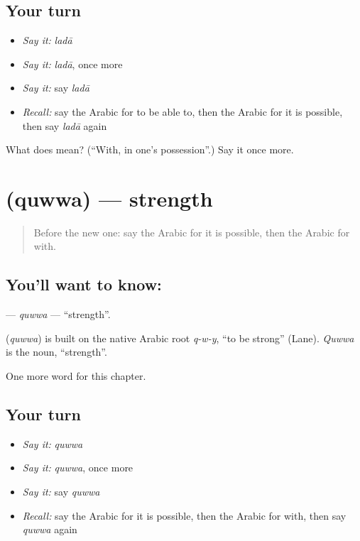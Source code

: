 \subsection*{Your turn}
\begin{itemize}
\raggedright
  \item \emph{Say it:} \emph{ladā}
  \item \emph{Say it:} \emph{ladā}, once more
  \item \emph{Say it:} say \emph{ladā}
  \item \emph{Recall:} say the Arabic for to be able to, then the Arabic for it is possible, then say \emph{ladā} again
\end{itemize}

\begin{tcolorbox}[breakable,colback=teal!4,colframe=teal!35!black,title={Before you move on}]
What does  mean? (\textquotedblleft{}With, in one's possession\textquotedblright{}.) Say it once more.
\end{tcolorbox}
\section[\texorpdfstring{\ar{قوة} (quwwa)}{قوة (quwwa)}]{ (quwwa) — strength}

\label{lesson:AR-C108-quwwa}



\begin{quote}
Before the new one: say the Arabic for it is possible, then the Arabic for with.
\end{quote}

\subsection*{You'll want to know: }
\textbf{} — \emph{quwwa} — \textquotedblleft{}strength\textquotedblright{}.

\begin{cousinweb}
\textbf{} (\emph{quwwa}) is built on the native Arabic root \emph{q-w-y}, \textquotedblleft{}to be strong\textquotedblright{} (Lane). \emph{Quwwa} is the noun, \textquotedblleft{}strength\textquotedblright{}.
\end{cousinweb}

\begin{grammarlens}[title={What you've built}]
One more word for this chapter.
\end{grammarlens}

\subsection*{Your turn}
\begin{itemize}
\raggedright
  \item \emph{Say it:} \emph{quwwa}
  \item \emph{Say it:} \emph{quwwa}, once more
  \item \emph{Say it:} say \emph{quwwa}
  \item \emph{Recall:} say the Arabic for it is possible, then the Arabic for with, then say \emph{quwwa} again
\end{itemize}

